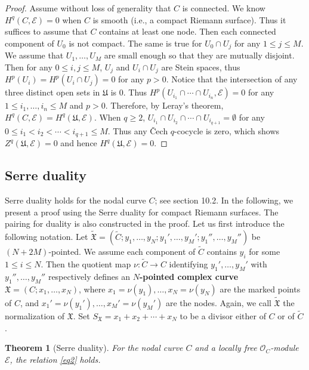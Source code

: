 \documentclass[12pt,a4paper,notitlepage]{report}
\theoremstyle{definition}
\theoremstyle{plain}
\newtheorem{thm}[df]{Theorem}
\newcommand{\fk}{\mathfrak}
\newcommand{\wtd}{\widetilde}
\newcommand{\scr}{\mathscr}
\newcommand{\SX}{S_{\fk X}}
\numberwithin{equation}{section}
\begin{document}
\begin{proof}
Assume without loss of generality that $C$ is connected. We know  $H^q(C,\scr E)=0$ when $C$ is smooth (i.e., a compact Riemann surface). Thus it suffices to assume that $C$ contains at least one node. Then each connected component of $U_0$ is not compact. The same is true for $U_0\cap U_j$ for any $1\leq j\leq M$. We assume that $U_1,\dots,U_M$ are small enough so that they are mutually disjoint. Then for any $0\leq i,j\leq M$, $U_j$ and $U_i\cap U_j$ are Stein spaces, thus $H^p(U_i)=H^p(U_i\cap U_j)=0$ for any $p> 0$. Notice that the intersection of any three distinct open sets in $\fk U$ is $0$. Thus $H^p(U_{i_1}\cap\cdots \cap U_{i_n},\scr E)=0$ for any $1\leq i_1,\dots, i_n\leq M$ and $p>0$. Therefore, by Leray's theorem, $H^q(C,\scr E)=H^q(\fk U,\scr E)$. When $q\geq 2$, $U_{i_1}\cap U_{i_2}\cap\cdots\cap U_{i_{q+1}}=\emptyset $ for any $0\leq i_1<i_2<\cdots<i_{q+1}\leq M$. Thus any \v Cech $q$-cocycle is zero, which shows $Z^q(\fk U,\scr E)=0$ and hence $H^q(\fk U,\scr E)=0$.
\end{proof}








\subsection*{Serre duality}






Serre duality holds for the nodal curve $C$; see \cite{ACG11} section 10.2. In the following, we present a proof using the Serre duality for compact Riemann surfaces. The pairing for duality is also constructed in the proof. Let us first introduce the following notation. Let $\wtd{\fk X}=(\wtd C;y_1,\dots,y_N;y_1',\dots,y_M';y_1'',\dots,y_M'')$ be $(N+2M)$-pointed. We assume each component of $\wtd C$ contains $y_i$ for some $1\leq i\leq N$. Then the quotient map $\nu:\wtd C\rightarrow C$ identifying $y_1',\dots,y_M'$ with $y_1'',\dots,y_M''$ respectively defines an  \textbf{$N$-pointed complex curve} $\fk X=(C;x_1,\dots,x_N)$, where $x_1=\nu(y_1),\dots,x_N=\nu(y_N)$ are the marked points of $C$, and $x_1'=\nu(y_1'),\dots,x_M'=\nu(y_M')$ are the nodes. Again, we call $\wtd{\fk X}$ the normalization of $\fk X$. Set $\SX=x_1+x_2+\cdots+x_N$ to be a divisor either of $C$ or of $\wtd C$. 


\begin{thm}[Serre duality]
For the nodal curve $C$ and a locally free $\scr O_C$-module $\scr E$, the relation \eqref{eq2} holds.
\end{thm}
\end{document}
